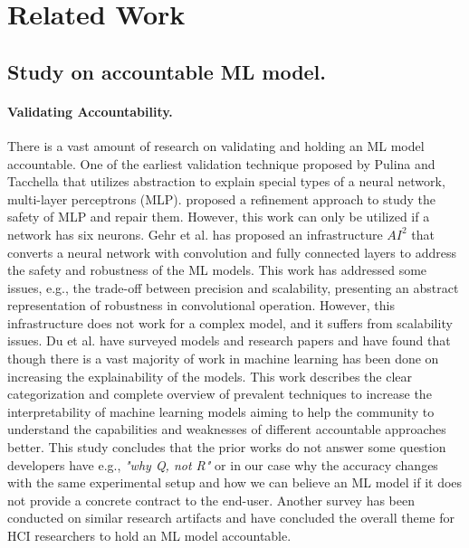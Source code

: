 \section{Related Work}
\label{sec:relatedwork}
\subsection{\textbf{Study on accountable ML model.}}
\paragraph{Validating Accountability.}
There is a vast amount of research on validating and holding an ML model accountable. One of the earliest validation technique proposed by Pulina and Tacchella \cite{pulina2010abstraction} that utilizes abstraction to explain special types of a neural network, multi-layer perceptrons (MLP). \cite{pulina2010abstraction} proposed a refinement approach to study the safety of MLP and repair them. However, this work can only be utilized if a network has six neurons. Gehr et al. \cite{gehr2018ai2} has proposed an infrastructure $AI^{2}$ that converts a neural network with convolution and fully connected layers to address the safety and robustness of the ML models. This work has addressed some issues, e.g., the trade-off between precision and scalability, presenting an abstract representation of robustness in convolutional operation. However, this infrastructure does not work for a complex model, and it suffers from scalability issues. Du et al. \cite{du2018techniques} have surveyed models and research papers and have found that though there is a vast majority of work in machine learning has been done on increasing the explainability of the models. This work describes the clear categorization and complete overview of prevalent techniques to increase the interpretability of machine learning models aiming to help the community to understand the capabilities and weaknesses of different accountable approaches better. This study concludes that the prior works do not answer some question developers have e.g., \emph{"why Q, not R"} or in our case why the accuracy changes with the same experimental setup and how we can believe an ML model if it does not provide a concrete contract to the end-user. Another survey \cite{abdul2018trends} has been conducted on similar research artifacts and have concluded the overall theme for HCI researchers to hold an ML model accountable.
